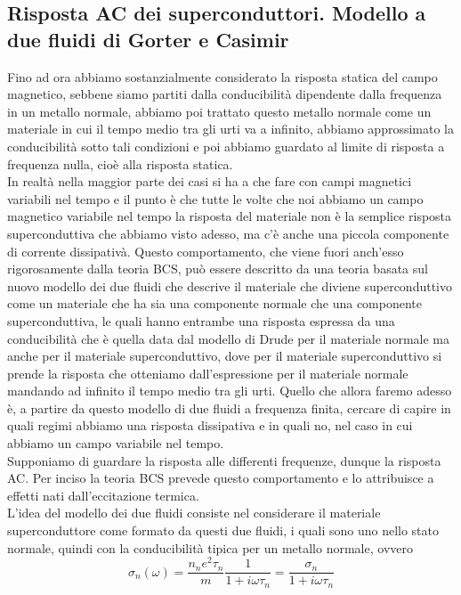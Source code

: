 \subsection{Risposta AC dei superconduttori. Modello a due fluidi di Gorter e Casimir}
Fino ad ora abbiamo sostanzialmente considerato la risposta statica del campo magnetico, sebbene siamo partiti dalla conducibilità dipendente dalla frequenza in un metallo normale, abbiamo poi trattato questo metallo normale come un materiale in cui il tempo medio tra gli urti va a infinito, abbiamo approssimato la conducibilità sotto tali condizioni e poi abbiamo guardato al limite di risposta a frequenza nulla, cioè alla risposta statica.\\
In realtà nella maggior parte dei casi si ha a che fare con campi magnetici variabili nel tempo e il punto è che tutte le volte che noi abbiamo un campo magnetico variabile nel tempo la risposta del materiale non è la semplice risposta superconduttiva che abbiamo visto adesso, ma c'è anche una piccola componente di corrente dissipativà. Questo comportamento, che viene fuori anch'esso rigorosamente dalla teoria BCS, può essere descritto da una teoria basata sul nuovo modello dei due fluidi che descrive il materiale che diviene superconduttivo come un materiale che ha sia una componente normale che una componente superconduttiva, le quali hanno entrambe una risposta espressa da una conducibilità che è quella data dal modello di Drude per il materiale normale ma anche per il materiale superconduttivo, dove per il materiale superconduttivo si prende la risposta che otteniamo dall'espressione per il materiale normale mandando ad infinito il tempo medio tra gli urti. Quello che allora faremo adesso è, a partire da questo modello di due fluidi a frequenza finita, cercare di capire in quali regimi abbiamo una risposta dissipativa e in quali no, nel caso in cui abbiamo un campo variabile nel tempo.\\
Supponiamo di guardare la risposta alle differenti frequenze, dunque la risposta AC. Per inciso la teoria BCS prevede questo comportamento e lo attribuisce a effetti nati dall'eccitazione termica.\\
L'idea del modello dei due fluidi consiste nel considerare il materiale superconduttore come formato da questi due fluidi, i quali sono uno nello stato normale, quindi con la conducibilità tipica per un metallo normale, ovvero
\begin{equation*}
   \sigma_n(\omega)
   =\frac{n_n e^2 \tau_n}{m} \frac{1}{1 + i\omega \tau_n}
   =\frac{\sigma_n}{1 + i\omega \tau_n}
\end{equation*}
